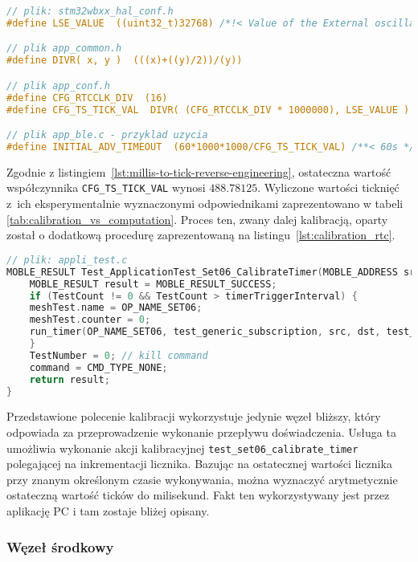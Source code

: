 \begin{lstlisting}[language=C,
    caption={Ścieżka inżynierii wstecznej w celu znalezienia współczynnika umożliwiającego konwersję milisekund do ticków},
    label={lst:millis-to-tick-reverse-engineering}]
// plik: stm32wbxx_hal_conf.h
#define LSE_VALUE  ((uint32_t)32768) /*!< Value of the External oscillator in Hz*/

// plik app_common.h
#define DIVR( x, y )  (((x)+((y)/2))/(y))

// plik app_conf.h
#define CFG_RTCCLK_DIV  (16)
#define CFG_TS_TICK_VAL  DIVR( (CFG_RTCCLK_DIV * 1000000), LSE_VALUE )

// plik app_ble.c - przyklad uzycia
#define INITIAL_ADV_TIMEOUT  (60*1000*1000/CFG_TS_TICK_VAL) /**< 60s */
\end{lstlisting}

Zgodnie z listingiem~\ref{lst:millis-to-tick-reverse-engineering}, ostateczna wartość współczynnika \texttt{CFG\_TS\_TICK\_VAL}
wynosi $488.78125$. Wyliczone wartości ticknięć z~ich eksperymentalnie wyznaczonymi odpowiednikami zaprezentowano w tabeli
\ref{tab:calibration_vs_computation}. Proces ten, zwany dalej kalibracją, oparty został o dodatkową procedurę zaprezentowaną
na listingu~\ref{lst:calibration_rtc}.


\begin{lstlisting}[language=C,
    caption={Kalibracja mikrokontrolera -- polecenie kalibracyjne},
    label={lst:calibration_rtc}]
// plik: appli_test.c
MOBLE_RESULT Test_ApplicationTest_Set06_CalibrateTimer(MOBLE_ADDRESS src ,MOBLE_ADDRESS dst) {
	MOBLE_RESULT result = MOBLE_RESULT_SUCCESS;
	if (TestCount != 0 && TestCount > timerTriggerInterval) {
	meshTest.name = OP_NAME_SET06;
	meshTest.counter = 0;
	run_timer(OP_NAME_SET06, test_generic_subscription, src, dst, test_set06_calibrate_timer);
	}
	TestNumber = 0; // kill command
	command = CMD_TYPE_NONE;
	return result;
}
\end{lstlisting}

Przedstawione polecenie kalibracji wykorzystuje jedynie węzeł bliższy, który odpowiada za przeprowadzenie
wykonanie przepływu doświadczenia. Usługa ta umożliwia wykonanie akcji kalibracyjnej \texttt{test\_set06\_calibrate\_timer}
polegającej na inkrementacji licznika. Bazując na ostatecznej wartości licznika przy znanym określonym czasie
wykonywania, można wyznaczyć arytmetycznie ostateczną wartość ticków do milisekund. Fakt ten wykorzystywany
jest przez aplikację PC i tam zostaje bliżej opisany.

\subsubsection{Węzeł środkowy}

